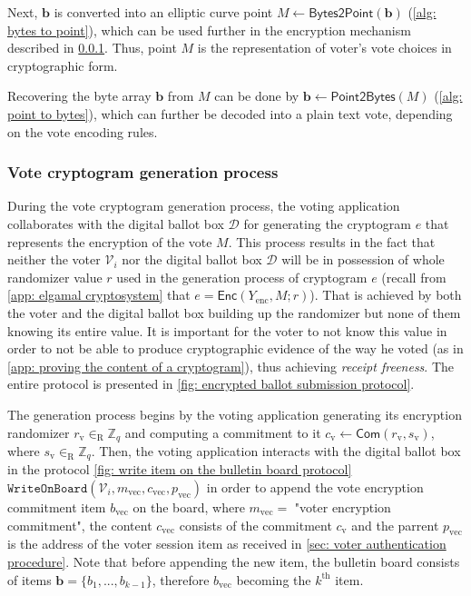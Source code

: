 Next, $\boldsymbol{b}$ is converted into an elliptic curve point $M \gets \mathsf{Bytes2Point}(\boldsymbol{b})$ (\cref{alg: bytes to point}), which can be used further in the encryption mechanism described in \cref{sec: vote cryptogram generation process}. Thus, point $M$ is the representation of voter's vote choices in cryptographic form.

Recovering the byte array $\boldsymbol{b}$ from $M$ can be done by $\boldsymbol{b} \gets \mathsf{Point2Bytes}(M)$ (\cref{alg: point to bytes}), which can further be decoded into a plain text vote, depending on the vote encoding rules.


\subsubsection{Vote cryptogram generation process} \label{sec: vote cryptogram generation process}
During the vote cryptogram generation process, the voting application collaborates with the digital ballot box $\mathcal{D}$ for generating the cryptogram $e$ that represents the encryption of the vote $M$. This process results in the fact that neither the voter $\mathcal{V}_i$ nor the digital ballot box $\mathcal{D}$ will be in possession of whole randomizer value $r$ used in the generation process of cryptogram $e$ (recall from \cref{app: elgamal cryptosystem} that $e = \mathsf{Enc}(Y_\mathrm{enc}, M; r)$). That is achieved by both the voter and the digital ballot box building up the randomizer but none of them knowing its entire value. It is important for the voter to not know this value in order to not be able to produce cryptographic evidence of the way he voted (as in \cref{app: proving the content of a cryptogram}), thus achieving \textit{receipt freeness}. The entire protocol is presented in \cref{fig: encrypted ballot submission protocol}.

The generation process begins by the voting application generating its encryption randomizer $r_\mathrm{v} \in_\mathrm{R} \mathbb{Z}_q$ and computing a commitment to it $c_\mathrm{v} \gets \mathsf{Com}(r_\mathrm{v}, s_\mathrm{v})$, where $s_\mathrm{v} \in_\mathrm{R} \mathbb{Z}_q$. Then, the voting application interacts with the digital ballot box in the protocol \ref{fig: write item on the bulletin board protocol} $\mathtt{WriteOnBoard}(\mathcal{V}_i, m_\mathrm{vec}, c_\mathrm{vec}, p_\mathrm{vec})$ in order to append the vote encryption commitment item $b_\mathrm{vec}$ on the board, where $m_\mathrm{vec} =$ "voter encryption commitment", the content $c_\mathrm{vec}$ consists of the commitment $c_\mathrm{v}$ and the parrent $p_\mathrm{vec}$ is the address of the voter session item as received in \cref{sec: voter authentication procedure}. Note that before appending the new item, the bulletin board consists of items $\boldsymbol{b} = \{ b_1, ..., b_{k-1} \}$, therefore $b_\mathrm{vec}$ becoming the $k^\mathrm{th}$ item.

